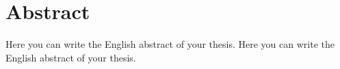 \newpage
{}
\chapter*{Abstract}

\ifnum{}
  Here you can write the English abstract of your thesis.
\else
  Here you can write the English abstract of your thesis.
\fi
